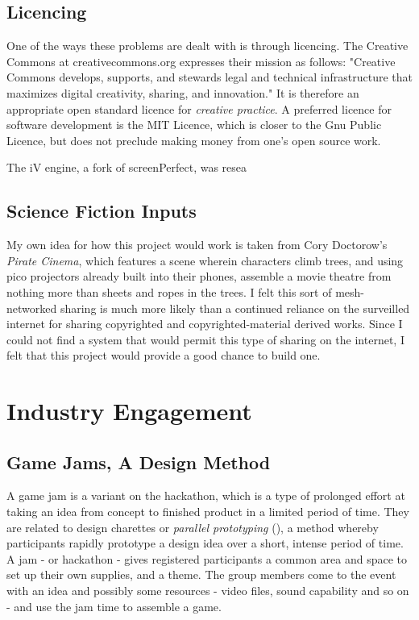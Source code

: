 \subsection{Licencing}
One of the ways these problems are dealt with is through licencing. The Creative Commons at creativecommons.org expresses their mission as follows: "Creative Commons develops, supports, and stewards legal and technical infrastructure that maximizes digital creativity, sharing, and innovation." It is therefore an appropriate open standard licence for \textit{creative practice}. A preferred licence for software development is the MIT Licence, which is closer to the Gnu Public Licence, but does not preclude making money from one's open source work.

The iV engine, a fork of screenPerfect, was resea

\subsection{Science Fiction Inputs}
My own idea for how this project would work is taken from Cory Doctorow's \textit{Pirate Cinema}, which features a scene wherein characters climb trees, and using pico projectors already built into their phones, assemble a movie theatre from nothing more than sheets and ropes in the trees. I felt this sort of mesh-networked sharing is much more likely than a continued reliance on the surveilled internet for sharing copyrighted and copyrighted-material derived works. Since I could not find a system that would permit this type of sharing on the internet, I felt that this project would provide a good chance to build one.

\section{Industry Engagement}

\subsection{Game Jams, A Design Method}

A game jam is a variant on the hackathon, which is a type of prolonged effort at taking an idea from concept to finished product in a limited period of time. They are related to design charettes or \textit{parallel prototyping} (\parencite{charette}), a method whereby participants rapidly prototype a design idea over a short, intense period of time. A jam - or hackathon - gives registered participants a common area and space to set up their own supplies, and a theme. The group members come to the event with an idea and possibly some resources - video files, sound capability and so on - and use the jam time to assemble a game.

